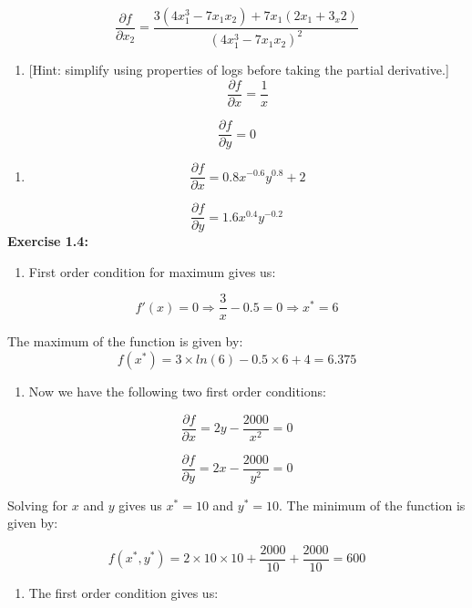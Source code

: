 \documentclass[
]{book}
\providecommand{\tightlist}{%
  \setlength{\itemsep}{0pt}\setlength{\parskip}{0pt}}
\theoremstyle{definition}
\theoremstyle{definition}
\theoremstyle{definition}
\theoremstyle{definition}
\theoremstyle{remark}
\begin{document}
\[\frac{\partial f}{\partial x_2}=\frac{3(4x_1^3-7x_1x_2)+7x_1(2x_1+3_x2)}{(4x_1^3-7x_1x_2)^2}\]

\begin{enumerate}
\def\labelenumi{\alph{enumi}.}
\setcounter{enumi}{2}
\tightlist
\item
  {[}Hint: simplify using properties of logs before taking the partial derivative.{]}
  \[\frac{\partial f}{\partial x}=\frac{1}{x}\]
\end{enumerate}

\[\frac{\partial f}{\partial y}=0\]

\begin{enumerate}
\def\labelenumi{\alph{enumi}.}
\setcounter{enumi}{3}
\tightlist
\item
  \[\frac{\partial f}{\partial x}=0.8x^{-0.6}y^{0.8} +2\]
\end{enumerate}

\[\frac{\partial f}{\partial y}=1.6x^{0.4}y^{-0.2}\]
\textbf{Exercise 1.4:}

\begin{enumerate}
\def\labelenumi{\alph{enumi}.}
\tightlist
\item
  First order condition for maximum gives us:
\end{enumerate}

\[f'(x)=0 \Rightarrow \frac{3}{x}-0.5=0 \Rightarrow x^*= 6\]

The maximum of the function is given by:
\[f(x^*)= 3 \times ln(6)-0.5\times 6 + 4=6.375\]

\begin{enumerate}
\def\labelenumi{\alph{enumi}.}
\setcounter{enumi}{1}
\tightlist
\item
  Now we have the following two first order conditions:
\end{enumerate}

\[\frac{\partial f}{\partial x}= 2y -\frac{2000}{x^2}=0 \]

\[\frac{\partial f}{\partial y}= 2x -\frac{2000}{y^2}=0 \]

Solving for \(x\) and \(y\) gives us \(x^*=10\) and \(y^*=10\). The minimum of the function is given by:

\[f(x^*,y^*) = 2 \times 10 \times 10+ \frac{2000}{10}+\frac{2000}{10}=600\]

\begin{enumerate}
\def\labelenumi{\alph{enumi}.}
\setcounter{enumi}{2}
\tightlist
\item
  The first order condition gives us:
\end{enumerate}
\end{document}

